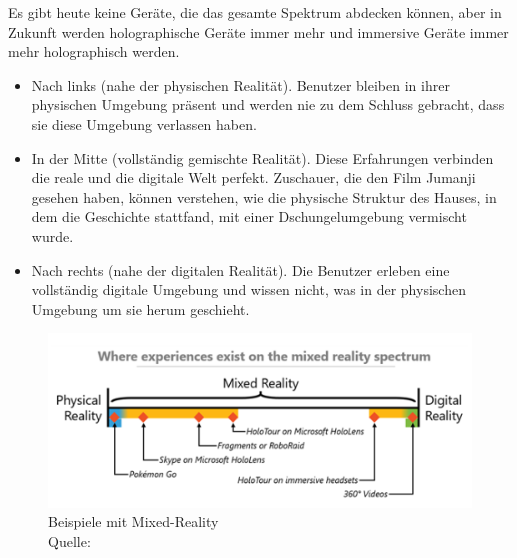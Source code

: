 Es gibt heute keine Geräte, die das gesamte Spektrum abdecken können, aber in Zukunft werden holographische Geräte immer mehr und immersive Geräte immer mehr holographisch werden.
\begin{itemize}
	\item Nach links (nahe der physischen Realität). Benutzer bleiben in ihrer physischen Umgebung präsent und werden nie zu dem Schluss gebracht, dass sie diese Umgebung verlassen haben.
	\item In der Mitte (vollständig gemischte Realität). Diese Erfahrungen verbinden die reale und die digitale Welt perfekt. Zuschauer, die den Film Jumanji gesehen haben, können verstehen, wie die physische Struktur des Hauses, in dem die Geschichte stattfand, mit einer Dschungelumgebung vermischt wurde.
	\item Nach rechts (nahe der digitalen Realität). Die Benutzer erleben eine vollständig digitale Umgebung und wissen nicht, was in der physischen Umgebung um sie herum geschieht.
\end{itemize}

\begin{figure}[ht]
	\centering
	\includegraphics[width=\textwidth,height=\textheight,keepaspectratio]{images/Beispiele mit Mixed-Reality.png}
	\caption{Beispiele mit Mixed-Reality \\ Quelle: \cite[vgl.][]{BrandonBray}}
	\label{Mixed-Reality1}
\end{figure}

